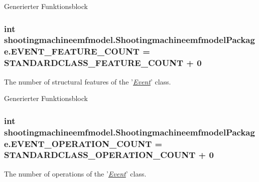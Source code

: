 Generierter Funktionsblock  \hypertarget{interfaceshootingmachineemfmodel_1_1_shootingmachineemfmodel_package_a3d4f3c28358c982d394cd32df420a857}{
\subsubsection[{E\-V\-E\-N\-T\-\_\-\-F\-E\-A\-T\-U\-R\-E\-\_\-\-C\-O\-U\-N\-T}]{\setlength{\rightskip}{0pt plus 5cm}int shootingmachineemfmodel.\-Shootingmachineemfmodel\-Package.\-E\-V\-E\-N\-T\-\_\-\-F\-E\-A\-T\-U\-R\-E\-\_\-\-C\-O\-U\-N\-T = {\bf S\-T\-A\-N\-D\-A\-R\-D\-C\-L\-A\-S\-S\-\_\-\-F\-E\-A\-T\-U\-R\-E\-\_\-\-C\-O\-U\-N\-T} + 0}}\label{interfaceshootingmachineemfmodel_1_1_shootingmachineemfmodel_package_a3d4f3c28358c982d394cd32df420a857}
The number of structural features of the '{\itshape \hyperlink{interfaceshootingmachineemfmodel_1_1_event}{Event}}' class.

Generierter Funktionsblock  \hypertarget{interfaceshootingmachineemfmodel_1_1_shootingmachineemfmodel_package_a24a1efdc251910cf4131efe9e2fee313}{
\subsubsection[{E\-V\-E\-N\-T\-\_\-\-O\-P\-E\-R\-A\-T\-I\-O\-N\-\_\-\-C\-O\-U\-N\-T}]{\setlength{\rightskip}{0pt plus 5cm}int shootingmachineemfmodel.\-Shootingmachineemfmodel\-Package.\-E\-V\-E\-N\-T\-\_\-\-O\-P\-E\-R\-A\-T\-I\-O\-N\-\_\-\-C\-O\-U\-N\-T = {\bf S\-T\-A\-N\-D\-A\-R\-D\-C\-L\-A\-S\-S\-\_\-\-O\-P\-E\-R\-A\-T\-I\-O\-N\-\_\-\-C\-O\-U\-N\-T} + 0}}\label{interfaceshootingmachineemfmodel_1_1_shootingmachineemfmodel_package_a24a1efdc251910cf4131efe9e2fee313}
The number of operations of the '{\itshape \hyperlink{interfaceshootingmachineemfmodel_1_1_event}{Event}}' class.

